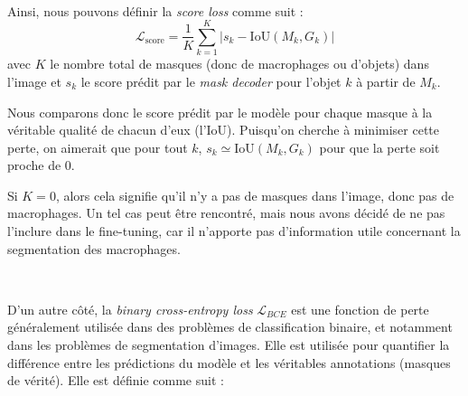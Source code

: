 \documentclass[a4paper,12pt]{report}
\begin{document}
\

Ainsi, nous pouvons définir la \textit{score loss} comme suit :
$$\mathcal{L}_{\text{score}} = \frac{1}{K}\displaystyle\sum_{k=1}^{K}\lvert s_k - \text{IoU}(M_k, G_k)\rvert$$
\noindent avec $K$ le nombre total de masques (donc de macrophages ou d'objets) dans l'image et $s_k$ le score prédit par le \textit{mask decoder} pour l'objet $k$ à partir de $M_k$.

Nous comparons donc le score prédit par le modèle pour chaque masque à la véritable qualité de chacun d'eux (l'IoU). Puisqu'on cherche à minimiser cette perte, on aimerait que pour tout $k$, $s_k\simeq \text{IoU}(M_k,G_k)$ pour que la perte soit proche de 0.

Si $K=0$, alors cela signifie qu'il n'y a pas de masques dans l'image, donc pas de macrophages. Un tel cas peut être rencontré, mais nous avons décidé de ne pas l'inclure dans le fine-tuning, car il n'apporte pas d'information utile concernant la segmentation des macrophages.

\

D'un autre côté, la \textit{binary cross-entropy loss} $\mathcal{L}_{BCE}$ est une fonction de perte généralement utilisée dans des problèmes de classification binaire, et notamment dans les problèmes de segmentation d'images. Elle est utilisée pour quantifier la différence entre les prédictions du modèle et les véritables annotations (masques de vérité). Elle est définie comme suit :
\end{document}
